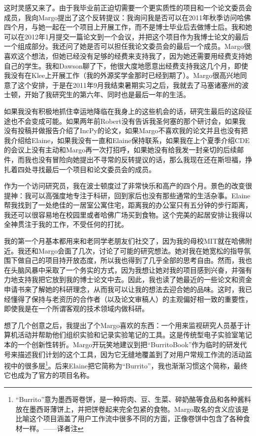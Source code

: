 \documentclass[12pt,UTF8,nofonts]{book}
\begin{document}
这时灵感又来了。由于我毕业前正迫切需要一个更实质性的项目和一个论文委员会成员，我向Margo提出了这个反转提议：我询问我是否可以在2011年秋季访问哈佛四个月，与她一起在一个项目上开展工作，而不是博士毕业后去做博士后。我和她可以在2012年1月提交一篇论文到一个会议，并把这个项目作为我博士论文的最后一个组成部分。我还问了她是否可以担任我论文委员会的最后一个成员。Margo很喜欢这个想法，但她已经没有足够的经费来支持我了，因为她还需要用经费支持她自己的学生。我和Dawson聊了下，他很大度地愿意出经费支持我这几个月，即使我没有在Klee上开展工作（我的外源奖学金那时已经到期了）。Margo很高兴地同意了这个安排，于是在2011年9月我结束暑期实习之后，我就去了马塞诸塞州的波士顿，开始了我研究生的第六年、同时也是最后一年的生活。

如果我没有积极地抓住幸运地降临在我身上的这些机会的话，研究生最后的这段征途也不会变成可能。如果两年前Robert没有告诉我圣何塞的那个研讨会，如果我没有投稿并做报告介绍了IncPy的论文，如果Margo不喜欢我的论文并且也没有把我介绍给Elaine，如果我没有一直和Elaine保持联系，如果我在上个夏季介绍CDE的会议上没有主动和Margo再一次打招呼，如果她没有给我发一封亲切的后续邮件，而我也没有冒险向她提出不寻常的反转提议的话，那么我现在还在斯坦福，挣扎着四处寻找最后一个项目和论文委员会的成员。

\breakline

作为一个访问研究员，我在波士顿度过了非常快乐和高产的四个月。景色的改变很提神：我可以高强度地专注于科研，回到家后也没有那些通常的生活杂事。Elaine帮我找到了一处绝佳的一居室公寓住宅，距离我的办公室只有五分钟的步行距离，我还可以很容易地在校园里或者哈佛广场买到食物。这个完美的起居安排让我得以全神贯注于我的工作，不受任何的打扰。

我的第一个月基本都用来和老同学老朋友们社交了，因为我的母校MIT就在哈佛附近。我还和Margo会面了几次，讨论了可能的研究想法。她对我在她宽松的指导氛围下做自己的项目持开放态度，所以我也得到了几乎全部的思考自由。然而，我也在头脑风暴中采取了一个务实的方式，因为我想让她对我的项目感到兴奋，并强有力地支持我把它放到我的博士论文中去。因此，我也读了她最近的一些论文和资金申请书来了解她的科研理念，从而我可以让我的想法去迎合她的品味。这时，我已经懂得了保持与老资历的合作者（以及论文审稿人）的主观偏好相一致的重要性，即使我是在一个所谓客观的技术领域内做科研。

想了几个创意之后，我提出了个Margo喜欢的东西：一个用来监视研究人员基于计算机活动并帮助他们组织实验和记录实验笔记的工具。这是传统型电子实验室笔记本的一个创新性转折。Margo开玩笑地建议到把“BurritoBook”作为临时的研发代号来描述我们计划的这个工具，因为它无缝地覆盖到了对用户常规工作流的活动监视中的很多层\footnote{``Burrito''意为墨西哥卷饼，是一种将肉、豆、生菜、碎奶酪等食品和各种酱料放在墨西哥薄饼上，并把饼卷起来完全包紧的食物。Margo取名的含义应该是比喻这个项目涵盖了用户工作流中很多不同的方面，正像卷饼中包含了各种食材一样。——译者注}。后来Elaine把它简称为“Burrito”，我也渐渐习惯这个简称，最终它也成为了官方的项目名称。
\end{document}

